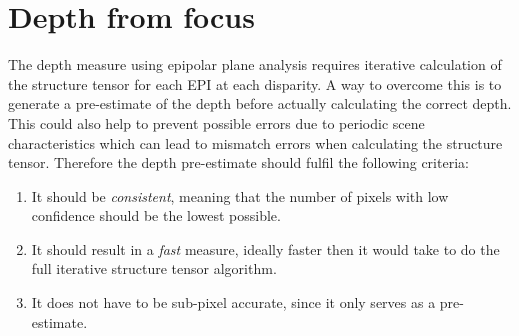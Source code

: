 \documentclass  [
  paper    = a4,
  BCOR     = 10mm,
  twoside,
  fontsize = 12pt,
  fleqn,
  toc      = bibnumbered,
  toc      = listofnumbered,
  numbers  = noendperiod,
  headings = normal,
  listof   = leveldown,
  version  = 3.03
]                                       {scrreprt}
\begin{document}
\section{Depth from focus}
\label{sec: depth from focus}
The depth measure using epipolar plane analysis requires iterative calculation of the structure tensor for each EPI at each disparity. A way to overcome this is to generate a pre-estimate of the depth before actually calculating the correct depth. This could also help to prevent possible errors due to periodic scene characteristics which can lead to mismatch errors when calculating the structure tensor. Therefore the depth pre-estimate should fulfil the following criteria:
\begin{enumerate}
	\item It should be \textit{consistent}, meaning that the number of pixels with low confidence should be the lowest possible.
	\item It should result in a \textit{fast} measure, ideally faster then it would take to do the full iterative structure tensor algorithm.
	\item It does not have to be sub-pixel accurate, since it only serves as a pre-estimate. 
\end{enumerate}
\end{document}
